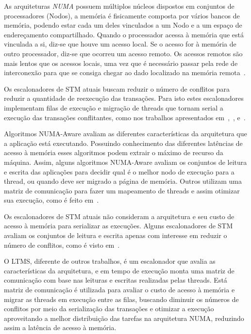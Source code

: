 \documentclass[diss,capa]{texufpel}
\begin{document}
As arquiteturas \emph{NUMA} possuem múltiplos núcleos dispostos em conjuntos de processadores (Nodos), a memória é fisicamente composta por vários bancos de memória, podendo estar cada um deles vinculados a um Nodo e a um espaço de endereçamento compartilhado. Quando o processador acessa à memória que está vinculada a si, diz-se que houve um acesso local. Se o acesso for à memória de outro processador, diz-se que ocorreu um acesso remoto. Os acessos remotos são mais lentos que os acessos locais, uma vez que é necessário passar pela rede de interconexão para que se consiga chegar ao dado localizado na memória remota~\cite{Rodolfo:2014}.

Os escalonadores de STM atuais buscam reduzir o número de conflitos para reduzir a quantidade de reexecução das transações. Para isto estes escalonadores implementam filas de execução e migração de threads que tornam serial a execução das transações conflitantes, como nos trabalhos apresentados em~\cite{shirink2009},~\cite{Nicacio2012}, e~\cite{rito2015}.

Algoritmos NUMA-Aware avaliam as diferentes características da arquitetura que a aplicação está executando. Possuindo conhecimento das diferentes latências de acesso à memória esses algoritmos podem extrair o máximo de recurso da máquina. Assim, alguns algoritmos NUMA-Aware avaliam os conjuntos de leitura e escrita das aplicações para decidir qual é o melhor nodo de execução para a thread, ou quando deve ser migrado a página de memória. Outros utilizam uma matriz de comunicação para fazer um mapeamento de threads e assim otimizar sua execução, como é feito em~\cite{pasqualin2020thread}.

Os escalonadores de STM atuais não consideram a arquitetura e seu custo de acesso à memória para serializar as execuções. Alguns escalonadores de STM avaliam os conjuntos de leitura e escrita apenas com interesse em reduzir o número de conflitos, como é visto em~\cite{shirink2009}.

O LTMS, diferente de outros trabalhos, é um escalonador que avalia as características da arquitetura, e em tempo de execução monta uma matriz de comunicação com base nas leituras e escritas realizadas pelas threads. Está matriz de comunicação é utilizada para avaliar o custo de acesso à memória e migrar as threads em execução entre as filas, buscando diminuir os números de conflitos por meio da serialização das transações e otimizar a execução aproveitando a melhor distribuição das tarefas na arquitetura NUMA, reduzindo assim a latência de acesso à memória.
\end{document}
